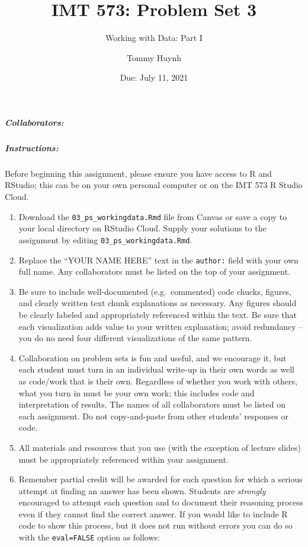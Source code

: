 \documentclass[
]{article}
\title{IMT 573: Problem Set 3}
\subtitle{Working with Data: Part I}
\author{Tommy Huynh}
\date{Due: July 11, 2021}
\begin{document}
\maketitle

\hypertarget{collaborators}{%
\subparagraph{\texorpdfstring{Collaborators:
}{Collaborators: }}\label{collaborators}}

\hypertarget{instructions}{%
\subparagraph{Instructions:}\label{instructions}}

Before beginning this assignment, please ensure you have access to R and
RStudio; this can be on your own personal computer or on the IMT 573 R
Studio Cloud.

\begin{enumerate}
\def\labelenumi{\arabic{enumi}.}
\item
  Download the \texttt{03\_ps\_workingdata.Rmd} file from Canvas or save
  a copy to your local directory on RStudio Cloud. Supply your solutions
  to the assignment by editing \texttt{03\_ps\_workingdata.Rmd}.
\item
  Replace the ``YOUR NAME HERE'' text in the \texttt{author:} field with
  your own full name. Any collaborators must be listed on the top of
  your assignment.
\item
  Be sure to include well-documented (e.g.~commented) code chucks,
  figures, and clearly written text chunk explanations as necessary. Any
  figures should be clearly labeled and appropriately referenced within
  the text. Be sure that each visualization adds value to your written
  explanation; avoid redundancy -- you do no need four different
  visualizations of the same pattern.
\item
  Collaboration on problem sets is fun and useful, and we encourage it,
  but each student must turn in an individual write-up in their own
  words as well as code/work that is their own. Regardless of whether
  you work with others, what you turn in must be your own work; this
  includes code and interpretation of results. The names of all
  collaborators must be listed on each assignment. Do not copy-and-paste
  from other students' responses or code.
\item
  All materials and resources that you use (with the exception of
  lecture slides) must be appropriately referenced within your
  assignment.
\item
  Remember partial credit will be awarded for each question for which a
  serious attempt at finding an answer has been shown. Students are
  \emph{strongly} encouraged to attempt each question and to document
  their reasoning process even if they cannot find the correct answer.
  If you would like to include R code to show this process, but it does
  not run without errors you can do so with the \texttt{eval=FALSE}
  option as follows:
\end{enumerate}
\end{document}
